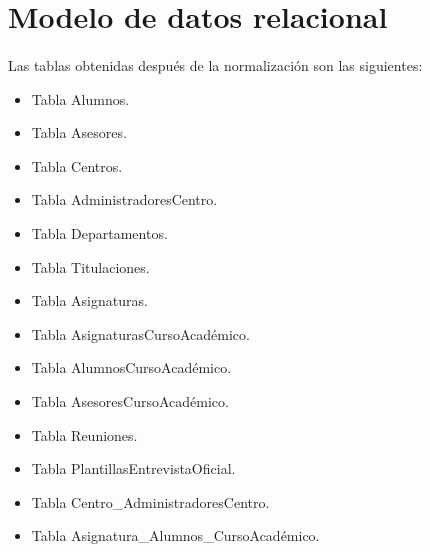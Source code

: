 \section{Modelo de datos relacional}

  \paragraph{}Las tablas obtenidas después de la normalización son las
  siguientes:

  \begin{itemize}
   \item Tabla Alumnos.
   \item Tabla Asesores.
   \item Tabla Centros.
   \item Tabla AdministradoresCentro.
   \item Tabla Departamentos.
   \item Tabla Titulaciones.
   \item Tabla Asignaturas.
   \item Tabla AsignaturasCursoAcadémico.
   \item Tabla AlumnosCursoAcadémico.
   \item Tabla AsesoresCursoAcadémico.
   \item Tabla Reuniones.
   \item Tabla PlantillasEntrevistaOficial.
   \item Tabla Centro\_AdministradoresCentro.
   \item Tabla Asignatura\_Alumnos\_CursoAcadémico.
  \end{itemize}















